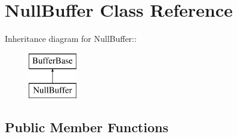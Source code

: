 \section{Null\-Buffer Class Reference}
\label{classNullBuffer}
Inheritance diagram for Null\-Buffer::\begin{figure}[H]
\begin{center}
\leavevmode
\includegraphics[height=2cm]{classNullBuffer}
\end{center}
\end{figure}
\subsection*{Public Member Functions}
